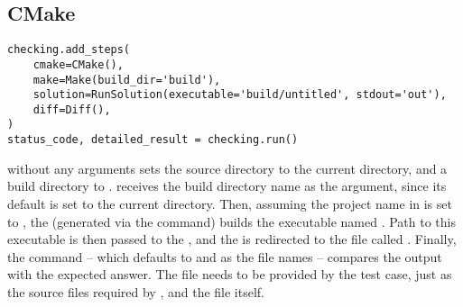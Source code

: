 \subsection{CMake}

\begin{verbatim}
checking.add_steps(
    cmake=CMake(),
    make=Make(build_dir='build'),
    solution=RunSolution(executable='build/untitled', stdout='out'),
    diff=Diff(),
)
status_code, detailed_result = checking.run()
\end{verbatim}

 without any arguments sets the source directory to the current directory, and a build directory to
.
 receives the build directory name as the argument, since its default is set to the current directory.
Then, assuming the project name in  is set to , the  (generated via the
 command) builds the executable named .
Path to this executable is then passed to the , and the  is redirected to the file
called .
Finally, the  command -- which defaults to  and  as the file names -- compares the
output with the expected answer.
The  file needs to be provided by the test case, just as the source files required by ,
and the  file itself.
